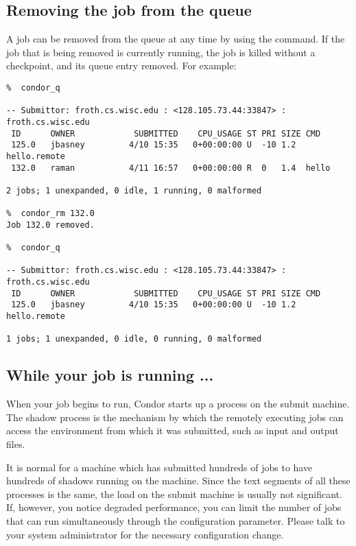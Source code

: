 \subsection{Removing the job from the queue}
A job can be removed from the queue at any time by using the 
command.  If the job that is being removed is currently running, the job
is killed without a checkpoint, and its queue entry removed.  For example:
\begin{verbatim}
%  condor_q

-- Submittor: froth.cs.wisc.edu : <128.105.73.44:33847> : froth.cs.wisc.edu
 ID      OWNER            SUBMITTED    CPU_USAGE ST PRI SIZE CMD               
 125.0   jbasney         4/10 15:35   0+00:00:00 U  -10 1.2  hello.remote      
 132.0   raman           4/11 16:57   0+00:00:00 R  0   1.4  hello             

2 jobs; 1 unexpanded, 0 idle, 1 running, 0 malformed

%  condor_rm 132.0
Job 132.0 removed.

%  condor_q

-- Submittor: froth.cs.wisc.edu : <128.105.73.44:33847> : froth.cs.wisc.edu
 ID      OWNER            SUBMITTED    CPU_USAGE ST PRI SIZE CMD               
 125.0   jbasney         4/10 15:35   0+00:00:00 U  -10 1.2  hello.remote      

1 jobs; 1 unexpanded, 0 idle, 0 running, 0 malformed
\end{verbatim}

\subsection{While your job is running ...}
When your job begins to run, Condor starts up a  process
on the submit machine.  The shadow process is the mechanism by which the
remotely executing jobs can access the environment from which it was
submitted, such as input and output files.  

It is normal for a machine which has submitted hundreds of jobs to have 
hundreds of shadows running on the machine.  Since the text segments of 
all these processes is the same, the load on the submit machine is usually 
not significant.  If, however, you notice degraded performance, you can limit 
the number of jobs that can run simultaneously through the 
 configuration parameter.  Please talk to your 
system administrator for the necessary configuration change.

